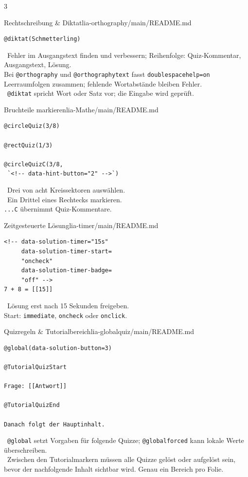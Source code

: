 \documentclass[a4paper,landscape,9pt]{extarticle}
\newcommand{\prevsm}[1]{{\footnotesize\color{muted} #1}}
\begin{document}
\begin{multicols}{3}
\begin{schulcard}{Rechtschreibung \& Diktat}{lia-orthography/main/README.md}
\begin{lstlisting}[language=lia]
@diktat(Schmetterling)
\end{lstlisting}
\tcblower
\prevsm{\faSpellCheck~Fehler im Ausgangstext finden und verbessern; Reihenfolge: Quiz-Kommentar, Ausgangstext, Lösung.\\[2pt]
Bei \texttt{@orthography} und \texttt{@orthographytext} fasst \texttt{doublespacehelp=\dq on\dq} Leerraumfolgen zusammen; fehlende Wortabstände bleiben Fehler.\\[2pt]
\faVolumeUp~\texttt{@diktat} spricht Wort oder Satz vor; die Eingabe wird geprüft.}
\end{schulcard}

\begin{schulcard}{Bruchteile markieren}{lia-Mathe/main/README.md}
\begin{lstlisting}[language=lia]
@circleQuiz(3/8)

@rectQuiz(1/3)

@circleQuizC(3/8,
 `<!-- data-hint-button="2" -->`)
\end{lstlisting}
\tcblower
\prevsm{\faCircleNotch~Drei von acht Kreissektoren auswählen.\\[2pt]
\faThLarge~Ein Drittel eines Rechtecks markieren.\\[2pt]
{\footnotesize \texttt{...C} übernimmt Quiz-Kommentare.}}
\end{schulcard}

\begin{schulcard}{Zeitgesteuerte Lösung}{lia-timer/main/README.md}
\begin{lstlisting}[language=lia]
<!-- data-solution-timer="15s"
     data-solution-timer-start=
     "oncheck"
     data-solution-timer-badge=
     "off" -->
7 + 8 = [[15]]
\end{lstlisting}
\tcblower
\prevsm{\faHourglassHalf~Lösung erst nach 15 Sekunden freigeben.\\[2pt]
Start: \texttt{immediate}, \texttt{oncheck} oder \texttt{onclick}.}
\end{schulcard}

\begin{schulcard}{Quizregeln \& Tutorialbereich}{lia-globalquiz/main/README.md}
\begin{lstlisting}[language=lia]
@global(data-solution-button=3)

@TutorialQuizStart

Frage: [[Antwort]]

@TutorialQuizEnd

Danach folgt der Hauptinhalt.
\end{lstlisting}
\tcblower
\prevsm{\faSlidersH~\texttt{@global} setzt Vorgaben für folgende Quizze; \texttt{@globalforced} kann lokale Werte überschreiben.\\[2pt]
\faTasks~Zwischen den Tutorialmarkern müssen alle Quizze gelöst oder aufgelöst sein, bevor der nachfolgende Inhalt sichtbar wird. Genau ein Bereich pro Folie.}
\end{schulcard}


\end{multicols}
\end{document}
